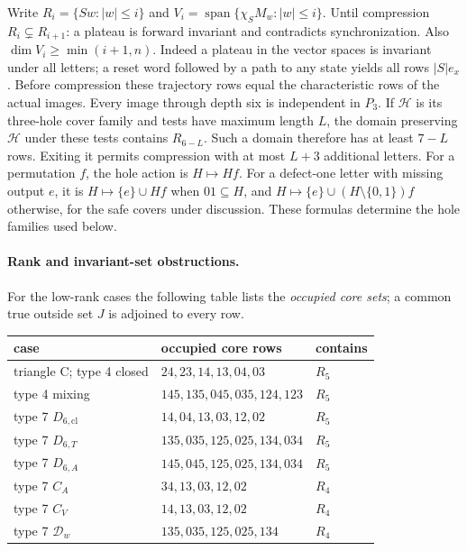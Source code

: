 \documentclass[11pt]{article}
\theoremstyle{definition}
\theoremstyle{plain}
\begin{document}
Write \(R_i=\{Sw:|w|\le i\}\) and
\(V_i=\operatorname{span}\{\chi_SM_w:|w|\le i\}\). Until compression
\(R_i\subsetneq R_{i+1}\): a plateau is forward invariant and
contradicts synchronization. Also \(\dim V_i\ge\min(i+1,n)\). Indeed
a plateau in the vector spaces is invariant under all letters; a
reset word followed by a path to any state yields all rows
\(|S|e_x\). Before compression these trajectory rows equal the
characteristic rows of the actual images. Every image through depth six
is independent in \(P_3\). If \(\mathcal H\) is its three-hole cover
family and tests have maximum length \(L\), the domain preserving
\(\mathcal H\) under these tests contains \(R_{6-L}\). Such a domain
therefore has at least \(7-L\) rows. Exiting it permits compression with
at most \(L+3\) additional letters. For a permutation \(f\), the
hole action is \(H\mapsto Hf\). For a defect-one letter with missing
output \(e\), it is \(H\mapsto\{e\}\cup Hf\) when \(01\subseteq H\), and
\(H\mapsto\{e\}\cup(H\setminus\{0,1\})f\) otherwise, for the safe covers
under discussion. These formulas determine the hole families used below.

\paragraph{Rank and invariant-set obstructions.}

For the low-rank cases the following table lists the \emph{occupied core
sets}; a common true outside set \(J\) is adjoined to every row.

\begin{center}\small
\begin{tabular}{lll}
case & occupied core rows & contains\\\hline
triangle C; type 4 closed & $24,23,14,13,04,03$ & $R_5$\\
type 4 mixing & $145,135,045,035,124,123$ & $R_5$\\
type 7 \(D_{6,\mathrm{cl}}\) & $14,04,13,03,12,02$ & $R_5$\\
type 7 \(D_{6,T}\) & $135,035,125,025,134,034$ & $R_5$\\
type 7 \(D_{6,A}\) & $145,045,125,025,134,034$ & $R_5$\\
type 7 $C_A$ & $34,13,03,12,02$ & $R_4$\\
type 7 $C_V$ & $14,13,03,12,02$ & $R_4$\\
type 7 $\mathcal D_w$ & $135,035,125,025,134$ & $R_4$
\end{tabular}
\end{center}
\end{document}
